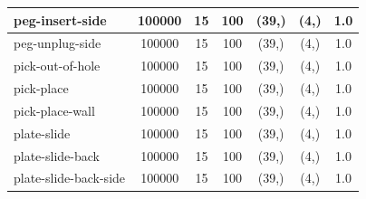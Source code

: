 \documentclass{article}
\theoremstyle{plain}
\theoremstyle{definition}
\theoremstyle{remark}
\begin{document}
\begin{table}[]
{\begin{tabular}{|l|c|c|c|c|c|c|}
peg-insert-side                     & 100000                                        & 15                                                   & 100                                             & (39,)                                           & (4,) & 1.0                                            \\ \hline
peg-unplug-side                     & 100000                                        & 15                                                   & 100                                             & (39,)                                           & (4,) & 1.0                                            \\ \hline
pick-out-of-hole                    & 100000                                        & 15                                                   & 100                                             & (39,)                                           & (4,) & 1.0                                            \\ \hline
pick-place                          & 100000                                        & 15                                                   & 100                                             & (39,)                                           & (4,) & 1.0                                            \\ \hline
pick-place-wall                     & 100000                                        & 15                                                   & 100                                             & (39,)                                           & (4,) & 1.0                                            \\ \hline
plate-slide                         & 100000                                        & 15                                                   & 100                                             & (39,)                                           & (4,) & 1.0                                            \\ \hline
plate-slide-back                    & 100000                                        & 15                                                   & 100                                             & (39,)                                           & (4,) & 1.0                                            \\ \hline
plate-slide-back-side               & 100000                                        & 15                                                   & 100                                             & (39,)                                           & (4,) & 1.0                                            \\ \hline

\end{tabular}}
\end{table}
\end{document}
